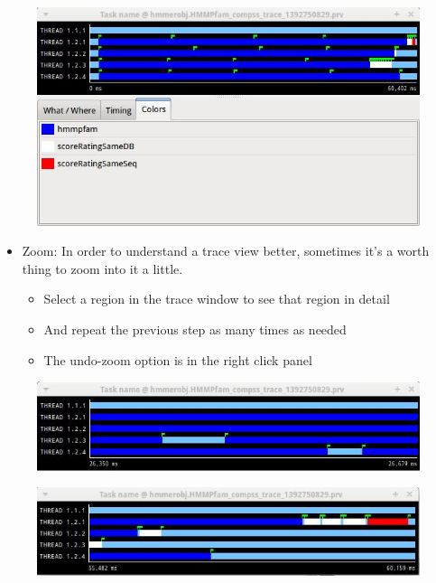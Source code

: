 \begin{figure}[ht!]
  \centering
    \includegraphics[width=1.0\textwidth]{./Sections/7_Tracing/Figures/5.jpeg}
\end{figure}

\begin{itemize}
 \item Zoom: In order to understand a trace view better, sometimes it’s a worth thing to zoom into it a little.
 \begin{itemize}
  \item Select a region in the trace window to see that region in detail
  \item And repeat the previous step as many times as needed
  \item The undo-zoom option is in the right click panel
 \end{itemize}
\end{itemize}

\begin{figure}[ht!]
  \centering
    \includegraphics[width=1.0\textwidth]{./Sections/7_Tracing/Figures/6.jpeg}
\end{figure}

\begin{figure}[ht!]
  \centering
    \includegraphics[width=1.0\textwidth]{./Sections/7_Tracing/Figures/6_2.jpeg}
\end{figure}


